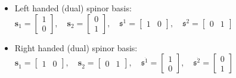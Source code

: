 \documentclass[../main.tex]{subfiles}
\begin{document}
\begin{itemize}
\begin{itemize}
\begin{align}
\textcolor{red}{\psi^\text{dual}}\textcolor{blue}{\phi}
&\equiv\textcolor{red}{\psi^T\epsilon}\textcolor{blue}{\phi}\\
&=\textcolor{red}{\left[\begin{matrix}\psi^1&\psi^2\end{matrix}\right]
\left[\begin{matrix}0&1\\-1&0\end{matrix}\right]}\textcolor{blue}{\left[\begin{matrix}\phi^1\\\phi^2\end{matrix}\right]}\\
&=\textcolor{red}{\left[\begin{matrix}-\psi^2&\psi^1\end{matrix}\right]}\textcolor{blue}{\left[\begin{matrix}\phi^1\\\phi^2\end{matrix}\right]}\\
&=\psi^1\phi^2-\psi^2\psi^1
\end{align}
therefore $\psi^T\epsilon\phi=-\phi\psi^T\epsilon$ and $\phi^T\epsilon\phi=0$
\item Left handed (dual) spinor basis: $\mathbf{s}_1=\left[\begin{matrix}1\\0\end{matrix}\right]
,\quad\mathbf{s}_2=\left[\begin{matrix}0\\1\end{matrix}\right]
,\quad\mathfrak{s}^1=\left[\begin{matrix}1&0\end{matrix}\right]
,\quad\mathfrak{s}^2=\left[\begin{matrix}0&1\end{matrix}\right]$
\item Right handed (dual) spinor basis: 
$\mathbf{s}_{\dot{1}}=\left[\begin{matrix}1&0\end{matrix}\right],
\quad\mathbf{s}_{\dot{2}}=\left[\begin{matrix}0&1\end{matrix}\right],
\quad\mathfrak{s}^{\dot{1}}=\left[\begin{matrix}1\\0\end{matrix}\right],
\quad\mathfrak{s}^{\dot{2}}=\left[\begin{matrix}0\\1\end{matrix}\right]$


\end{itemize}
\end{itemize}
\end{document}

